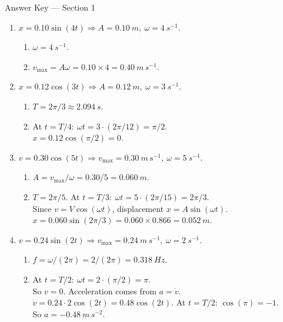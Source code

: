 \documentclass[12pt]{article}
\begin{document}
\newpage
\begin{center}
{\LARGE Answer Key — Section 1}
\end{center}

\begin{enumerate}
\item \(x=0.10\sin(4t)\Rightarrow A=\SI{0.10}{m},\ \omega=\SI{4}{s^{-1}}\).
\begin{enumerate}[label=\alph*)]
\item \(\omega=\boxed{\SI{4}{s^{-1}}}\).
\item \(v_{\max}=A\omega=0.10\times 4=\boxed{\SI{0.40}{m\,s^{-1}}}\).
\end{enumerate}

\item \(x=0.12\cos(3t)\Rightarrow A=\SI{0.12}{m},\ \omega=\SI{3}{s^{-1}}\).
\begin{enumerate}[label=\alph*)]
\item \(T=2\pi/3\approx\boxed{\SI{2.094}{s}}\).
\item At \(t=T/4:\ \omega t=3\cdot (2\pi/12)=\pi/2\). \\
\(x=0.12\cos(\pi/2)=\boxed{0}\).
\end{enumerate}

\item \(v=0.30\cos(5t)\Rightarrow v_{\max}=\SI{0.30}{m\,s^{-1}},\ \omega=\SI{5}{s^{-1}}\).
\begin{enumerate}[label=\alph*)]
\item \(A=v_{\max}/\omega=0.30/5=\boxed{\SI{0.060}{m}}\).
\item \(T=2\pi/5\). At \(t=T/3:\ \omega t=5\cdot (2\pi/15)=2\pi/3\). \\
Since \(v=V\cos(\omega t)\), displacement \(x=A\sin(\omega t)\). \\
\(x=0.060\sin(2\pi/3)=0.060\times 0.866=\boxed{\SI{0.052}{m}}\).
\end{enumerate}

\item \(v=0.24\sin(2t)\Rightarrow v_{\max}=\SI{0.24}{m\,s^{-1}},\ \omega=\SI{2}{s^{-1}}\).
\begin{enumerate}[label=\alph*)]
\item \(f=\omega/(2\pi)=2/(2\pi)=\boxed{\SI{0.318}{Hz}}\).
\item At \(t=T/2:\ \omega t=2\cdot (\pi/2)=\pi\). \\
So \(v=0\). Acceleration comes from \(a=\dot v\). \\
\(\dot v=0.24\cdot 2\cos(2t)=0.48\cos(2t)\). At \(t=T/2\): \(\cos(\pi)=-1\). \\
So \(a=\boxed{-0.48\ \si{m\,s^{-2}}}\).
\end{enumerate}


\end{enumerate}
\end{document}
